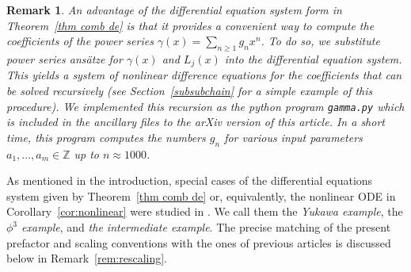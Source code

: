\documentclass[oneside]{amsart}
\newtheorem{remark}[thm]{Remark}
\theoremstyle{definition}
\newcommand{\Z}{{\mathbb{Z}}}
\begin{document}
\begin{remark}
\label{remark gamma program}
An advantage of the differential equation system form in 
Theorem~\ref{thm comb de} is that it provides a convenient way to compute the coefficients of the power series $\gamma(x)=\sum_{n\geq 1} g_n x^n$.
To do so, we substitute power series ansätze for $\gamma(x)$ and $L_j(x)$ into the differential equation system. This yields a system of nonlinear difference equations for the coefficients that can be solved recursively
(see Section~\ref{subsubchain} for a simple example of this procedure). We implemented this recursion as the python program \texttt{gamma.py} which is included in the ancillary files to the arXiv version of this article.
In a short time, this program computes the numbers $g_n$ for various input parameters $a_1,\ldots,a_m \in \Z$ up to $n\approx 1000$.
\end{remark}

As mentioned in the introduction, special cases of the differential equations system given by Theorem~\ref{thm comb de} or, equivalently, the nonlinear ODE in Corollary~\ref{cor:nonlinear}
were studied in \cite{bkerfc, BD, BDM, BB}. We call them the \emph{Yukawa example}, the \emph{$\phi^3$ example}, and \emph{the intermediate example}.
The precise matching of the present prefactor and scaling conventions with the ones of previous articles is discussed below in Remark~\ref{rem:rescaling}.
\end{document}
